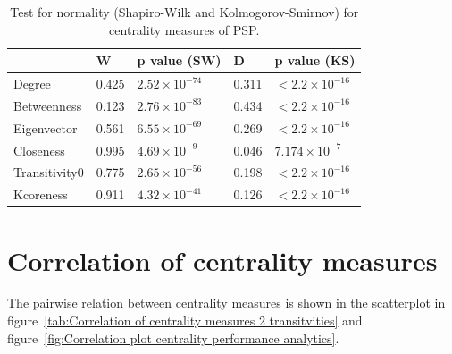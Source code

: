 

\begin{table}[ht]
\centering
\begin{tabular}{lllll}
  \toprule
 & W & p value (SW) &D & p value (KS) \\ 
  \midrule
Degree & 0.425 & $2.52 \times 10^{-74}$& 0.311 & $<2.2 \times 10^{-16}$  \\ 
 Betweenness & 0.123 & $2.76 \times 10^{-83}$  & 0.434  & $<2.2 \times 10^{-16}$ \\ 
 Eigenvector & 0.561 & $6.55 \times 10^{-69}$&   0.269&$<2.2 \times 10^{-16}$ \\ 
 Closeness & 0.995 & $4.69 \times 10^{-9}$ &  0.046&$7.174 \times 10^{-7}$  \\ 
 Transitivity0 & 0.775 & $2.65 \times 10^{-56}$&0.198 &$<2.2 \times 10^{-16}$ \\ 
 Kcoreness & 0.911 & $4.32 \times 10^{-41}$& 0.126 &$<2.2 \times 10^{-16}$ \\ 
   \bottomrule
\end{tabular}
\caption[Shapiro-Wilk and Kolmogorov-Smirnov tests for centrality measures in the PSP]{Test for normality (Shapiro-Wilk and Kolmogorov-Smirnov) for centrality measures of PSP.}
\label{tab:Test for normality (Shapiro-Wilk) for centrality measures of PSPcombinedKS}
\end{table}

\section{Correlation of centrality measures}
\label{sec:correlation of centrality measures results section}
The pairwise relation between centrality measures is shown in the scatterplot in figure~\ref{tab:Correlation of centrality measures 2 transitvities} and figure~\ref{fig:Correlation plot centrality performance analytics}.

